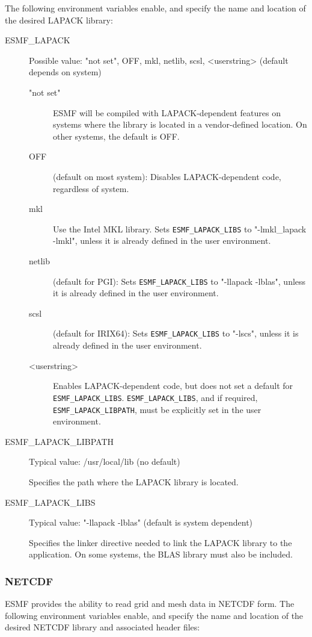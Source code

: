 The following environment variables enable, and specify the name and location of
the desired LAPACK library:
\begin{description}

\item[ESMF\_LAPACK] Possible value: "not set", OFF, mkl, netlib, scsl, <userstring> (default depends on system)

\begin{description}
\item["not set"] ESMF will be compiled with LAPACK-dependent features
on systems where the library is located in a vendor-defined location.  On
other systems, the default is OFF.

\item[OFF] (default on most system): Disables LAPACK-dependent code, regardless of system.

\item[mkl] Use the Intel MKL library.  Sets {\tt ESMF\_LAPACK\_LIBS} to
"-lmkl\_lapack -lmkl",
unless it is already defined in the user environment.

\item[netlib] (default for PGI): Sets {\tt ESMF\_LAPACK\_LIBS} to "-llapack -lblas",
unless it is already defined in the user environment.

\item[scsl] (default for IRIX64): Sets {\tt ESMF\_LAPACK\_LIBS} to "-lscs",
unless it is already defined in the user environment.

\item[<userstring>] Enables LAPACK-dependent code, but does not set a default for
{\tt ESMF\_LAPACK\_LIBS}.  {\tt ESMF\_LAPACK\_LIBS}, and if required,
{\tt ESMF\_LAPACK\_LIBPATH},
must be explicitly set in the user environment.
\end{description}

\item[ESMF\_LAPACK\_LIBPATH] Typical value: /usr/local/lib (no default)

Specifies the path where the LAPACK library is located.

\item[ESMF\_LAPACK\_LIBS] Typical value: "-llapack -lblas" (default is system
dependent)

Specifies the linker directive needed to link the LAPACK library to
the application.  On some systems, the BLAS library must also be included.
\end{description}

\subsubsection{NETCDF}
\label{sec:netcdf}
ESMF provides the ability to read grid and mesh data in NETCDF form.  The
following environment variables enable, and specify the name and location
of the desired NETCDF library and associated header files:

